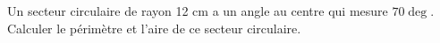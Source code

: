 
Un secteur circulaire de rayon 12 cm a un angle au centre qui mesure $70\deg$. Calculer le périmètre et l'aire de ce secteur circulaire.
